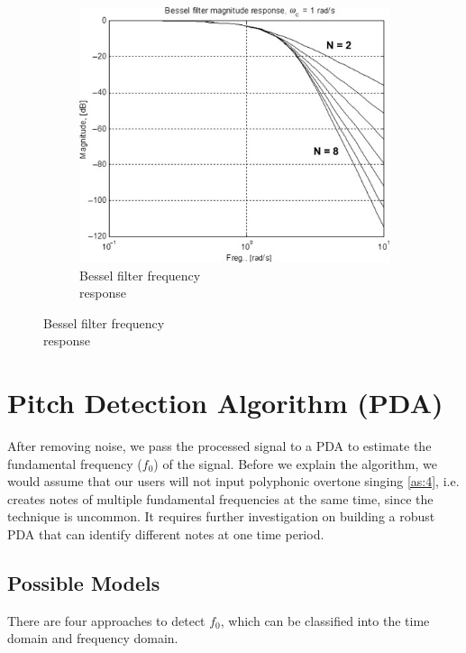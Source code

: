 \begin{figure}[h]
\begin{subfigure}{.3\textwidth}
		\includegraphics[width=1\linewidth]{Figures/bessel.jpg}
		\caption{Bessel filter frequency\\response}
		\label{fig:sub3}
	\end{subfigure}

\end{figure}

\section{Pitch Detection Algorithm (PDA)}
\label{sec:PDA}
After removing noise, we pass the processed signal to a PDA to estimate the fundamental frequency ($f_0$) of
the signal. Before we explain the algorithm, we would assume that our users will not input polyphonic overtone 
singing \cref{as:4}, i.e. creates notes of multiple fundamental frequencies at the same time, since the technique is uncommon. 
It requires further investigation on building a robust PDA that can identify different notes at one time period.

\subsection{Possible Models}
There are four approaches to detect $f_0$, which can be classified into the time domain and frequency domain.

